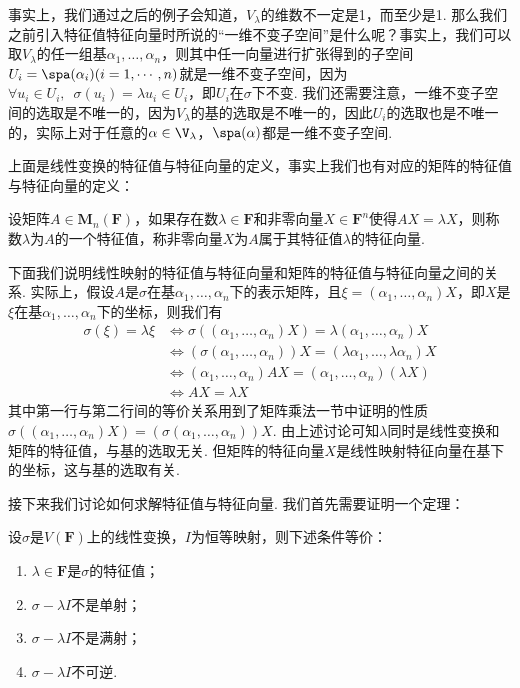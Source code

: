 事实上，我们通过之后的例子会知道，$V_\lambda$的维数不一定是1，而至少是1. 那么我们之前引入特征值特征向量时所说的``一维不变子空间''是什么呢？事实上，我们可以取$V_\lambda$的任一组基$\alpha_1,\ldots,\alpha_n$，则其中任一向量进行扩张得到的子空间$U_i=\spa(\alpha_i)(i=1,\cdots,n)$就是一维不变子空间，因为$\forall u_i\in U_i,\enspace \sigma(u_i)=\lambda u_i\in U_i$，即$U_i$在$\sigma$下不变. 我们还需要注意，一维不变子空间的选取是不唯一的，因为$V_\lambda$的基的选取是不唯一的，因此$U_i$的选取也是不唯一的，实际上对于任意的$\alpha\in\V_{\lambda}$，$\spa(\alpha)$都是一维不变子空间.

上面是线性变换的特征值与特征向量的定义，事实上我们也有对应的矩阵的特征值与特征向量的定义：
\begin{definition}
    设矩阵$A\in \mathbf{M}_n(\mathbf{F})$，如果存在数$\lambda\in\mathbf{F}$和非零向量$X\in\mathbf{F}^n$使得$AX=\lambda X$，则称数$\lambda$为$A$的一个特征值，称非零向量$X$为$A$属于其特征值$\lambda$的特征向量.
\end{definition}

下面我们说明线性映射的特征值与特征向量和矩阵的特征值与特征向量之间的关系. 实际上，假设$A$是$\sigma$在基$\alpha_1,\ldots,\alpha_n$下的表示矩阵，且$\xi=(\alpha_1,\ldots,\alpha_n)X$，即$X$是$\xi$在基$\alpha_1,\ldots,\alpha_n$下的坐标，则我们有
\begin{align*}
    \sigma(\xi)=\lambda\xi & \iff \sigma((\alpha_1,\ldots,\alpha_n)X)=\lambda(\alpha_1,\ldots,\alpha_n)X        \\
                           & \iff (\sigma(\alpha_1,\ldots,\alpha_n))X=(\lambda\alpha_1,\ldots,\lambda\alpha_n)X \\
                           & \iff (\alpha_1,\ldots,\alpha_n)AX=(\alpha_1,\ldots,\alpha_n)(\lambda X)            \\
                           & \iff AX=\lambda X
\end{align*}
其中第一行与第二行间的等价关系用到了矩阵乘法一节中证明的性质$\sigma((\alpha_1,\ldots,\alpha_n)X)=(\sigma(\alpha_1,\ldots,\alpha_n))X$. 由上述讨论可知$\lambda$同时是线性变换和矩阵的特征值，与基的选取无关. 但矩阵的特征向量$X$是线性映射特征向量在基下的坐标，这与基的选取有关.

接下来我们讨论如何求解特征值与特征向量. 我们首先需要证明一个定理：
\begin{theorem}
    设$\sigma$是$V(\mathbf{F})$上的线性变换，$I$为恒等映射，则下述条件等价：
    \begin{enumerate}[label=(\arabic*)]
        \item \label{item:18:特征值定义:1}
              $\lambda\in\mathbf{F}$是$\sigma$的特征值；

        \item \label{item:18:特征值定义:2}
              $\sigma-\lambda I$不是单射；

        \item \label{item:18:特征值定义:3}
              $\sigma-\lambda I$不是满射；

        \item \label{item:18:特征值定义:4}
              $\sigma-\lambda I$不可逆.
    \end{enumerate}
\end{theorem}

